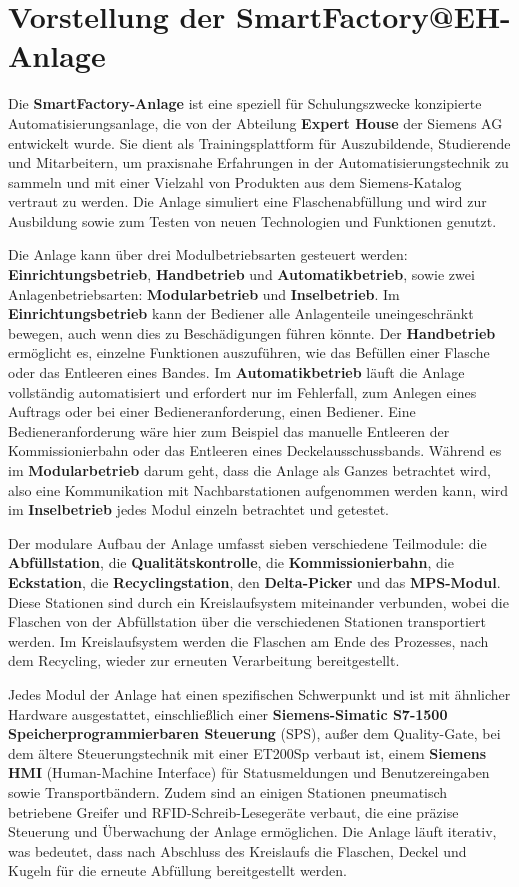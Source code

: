 \chapter{Vorstellung der SmartFactory@EH-Anlage}\label{ch:experiments}

Die \textbf{SmartFactory-Anlage} ist eine speziell für Schulungszwecke konzipierte Automatisierungsanlage, die von der Abteilung 
\textbf{Expert House} der Siemens AG entwickelt wurde. Sie dient als Trainingsplattform für Auszubildende, Studierende und Mitarbeitern, um praxisnahe 
Erfahrungen in der Automatisierungstechnik zu sammeln und mit einer Vielzahl von Produkten aus dem Siemens-Katalog vertraut zu werden. Die 
Anlage simuliert eine Flaschenabfüllung und wird zur Ausbildung sowie zum Testen von neuen Technologien und Funktionen genutzt.

Die Anlage kann über drei Modulbetriebsarten gesteuert werden: \textbf{Einrichtungsbetrieb}, \textbf{Handbetrieb} und \textbf{Automatikbetrieb}, 
sowie zwei Anlagenbetriebsarten: \textbf{Modularbetrieb} und \textbf{Inselbetrieb}. Im \textbf{Einrichtungsbetrieb} kann der Bediener alle Anlagenteile 
uneingeschränkt bewegen, auch wenn dies zu Beschädigungen führen könnte. Der \textbf{Handbetrieb} ermöglicht es, einzelne Funktionen 
auszuführen, wie das Befüllen einer Flasche oder das Entleeren eines Bandes. Im \textbf{Automatikbetrieb} läuft die Anlage vollständig 
automatisiert und erfordert nur im Fehlerfall, zum Anlegen eines Auftrags oder bei einer Bedieneranforderung, einen Bediener. Eine Bedieneranforderung
wäre hier zum Beispiel das manuelle Entleeren der Kommissionierbahn oder das Entleeren eines Deckelausschussbands. Während es im \textbf{Modularbetrieb}
darum geht, dass die Anlage als Ganzes betrachtet wird, also eine Kommunikation mit Nachbarstationen aufgenommen werden kann,
 wird im \textbf{Inselbetrieb} jedes Modul einzeln betrachtet und getestet.

Der modulare Aufbau der Anlage umfasst sieben verschiedene Teilmodule: die \textbf{Abfüllstation}, die \textbf{Qualitätskontrolle}, die 
\textbf{Kommissionierbahn}, die \textbf{Eckstation}, die \textbf{Recyclingstation}, den \textbf{Delta-Picker} und das \textbf{MPS-Modul}. 
Diese Stationen sind durch ein Kreislaufsystem miteinander verbunden, wobei die Flaschen von der Abfüllstation über die verschiedenen 
Stationen transportiert werden. Im Kreislaufsystem werden die Flaschen am Ende des Prozesses, nach dem Recycling, wieder zur erneuten 
Verarbeitung bereitgestellt.

Jedes Modul der Anlage hat einen spezifischen Schwerpunkt und ist mit ähnlicher Hardware ausgestattet, einschließlich einer 
\textbf{Siemens-Simatic S7-1500 Speicherprogrammierbaren Steuerung} (SPS), außer dem Quality-Gate, bei dem ältere Steuerungstechnik 
mit einer ET200Sp verbaut ist, einem \textbf{Siemens HMI} (Human-Machine Interface) für 
Statusmeldungen und Benutzereingaben sowie Transportbändern. Zudem sind an einigen Stationen pneumatisch betriebene Greifer und 
RFID-Schreib-Lesegeräte verbaut, die eine präzise Steuerung und Überwachung der Anlage ermöglichen. Die Anlage läuft iterativ, was 
bedeutet, dass nach Abschluss des Kreislaufs die Flaschen, Deckel und Kugeln für die erneute Abfüllung bereitgestellt werden.


